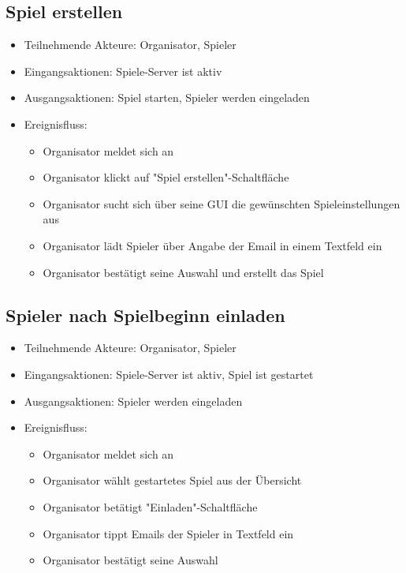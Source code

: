 \documentclass[a4paper]{scrreprt}
\begin{document}
    \subsection{Spiel erstellen}
    \begin{itemize}
        \item Teilnehmende Akteure: \Gls{Organisator}, \Gls{Spieler}
        \item Eingangsaktionen: Spiele-Server ist aktiv
        \item Ausgangsaktionen: Spiel starten, \Gls{Spieler} werden eingeladen
        \item Ereignisfluss:
        \begin{itemize}
            \item \Gls{Organisator} meldet sich an
            \item \Gls{Organisator} klickt auf "Spiel erstellen"-Schaltfläche
            \item \Gls{Organisator} sucht sich über seine GUI die gewünschten \Gls{Spieleinstellungen} aus
            \item \Gls{Organisator} lädt \Gls{Spieler} über Angabe der Email in einem Textfeld ein
            \item \Gls{Organisator} bestätigt seine Auswahl und erstellt das Spiel
        \end{itemize}
    \end{itemize}

    \subsection{Spieler nach Spielbeginn einladen}
    \begin{itemize}
        \item Teilnehmende Akteure: \Gls{Organisator}, \Gls{Spieler}
        \item Eingangsaktionen: Spiele-Server ist aktiv, Spiel ist gestartet
        \item Ausgangsaktionen: \Gls{Spieler} werden eingeladen
        \item Ereignisfluss:
        \begin{itemize}
            \item \Gls{Organisator} meldet sich an
            \item \Gls{Organisator} wählt gestartetes Spiel aus der Übersicht
            \item \Gls{Organisator} betätigt "Einladen"-Schaltfläche
            \item \Gls{Organisator} tippt Emails der \Gls{Spieler} in Textfeld ein
            \item \Gls{Organisator} bestätigt seine Auswahl
        \end{itemize}
    \end{itemize}
\end{document}
